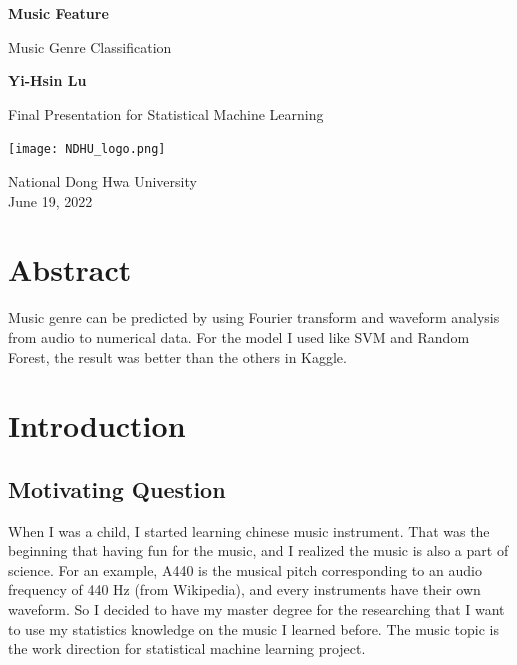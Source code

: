 \documentclass[12pt,a4paper]{article}
\begin{document}
\begin{titlepage}
   \begin{center}
       \vspace*{1cm}

       \textbf{\Huge{Music Feature}}

       \vspace{0.5cm}
        \Large{Music Genre Classification}
            
       \vspace{1.5cm}

       \textbf{Yi-Hsin Lu}

       \vfill
            
        Final Presentation for Statistical Machine Learning
            
       \vspace{0.8cm}
     
       \texttt{[image: NDHU\_logo.png]}
            
       National Dong Hwa University\\
       June 19, 2022
   \end{center}
\end{titlepage}

\tableofcontents

\newpage

\section*{Abstract}
Music genre can be predicted by using Fourier transform and waveform analysis from audio to numerical data. For the model I used like SVM and Random Forest, the result was better than the others in Kaggle.


\section{Introduction}
\subsection{Motivating Question}
When I was a child, I started learning chinese music instrument. That was the beginning that having fun for the music, and I realized the music is also a part of science. For an example, A440 is the musical pitch corresponding to an audio frequency of 440 Hz (from Wikipedia), and every instruments have their own waveform. So I decided to have my master degree for the researching that I want to use my statistics knowledge on the music I learned before. The music topic is the work direction for statistical machine learning project.
\end{document}

